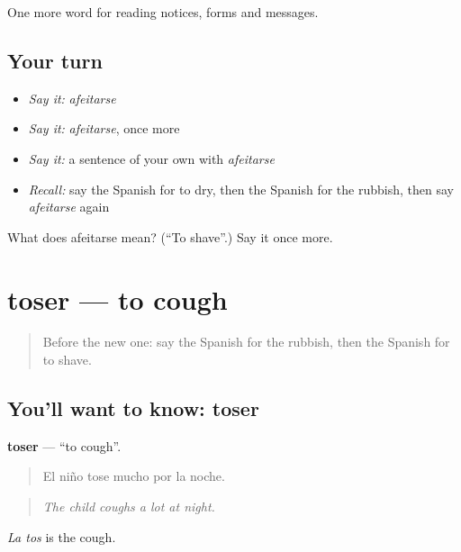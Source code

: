 \begin{grammarlens}[title={What you've built}]
One more word for reading notices, forms and messages.
\end{grammarlens}

\subsection*{Your turn}
\begin{itemize}
\raggedright
  \item \emph{Say it:} \emph{afeitarse}
  \item \emph{Say it:} \emph{afeitarse}, once more
  \item \emph{Say it:} a sentence of your own with \emph{afeitarse}
  \item \emph{Recall:} say the Spanish for to dry, then the Spanish for the rubbish, then say \emph{afeitarse} again
\end{itemize}

\begin{tcolorbox}[breakable,colback=teal!4,colframe=teal!35!black,title={Before you move on}]
What does afeitarse mean? (\textquotedblleft{}To shave\textquotedblright{}.) Say it once more.
\end{tcolorbox}
\section[toser]{toser — to cough}

\label{lesson:ES-C486-toser}



\begin{quote}
Before the new one: say the Spanish for the rubbish, then the Spanish for to shave.
\end{quote}

\subsection*{You'll want to know: toser}
\textbf{toser} — \textquotedblleft{}to cough\textquotedblright{}.

\begin{quote}
El niño tose mucho por la noche.
\end{quote}

\begin{quote}
\emph{The child coughs a lot at night.}
\end{quote}

\emph{La tos} is the cough.

